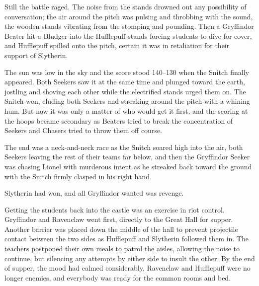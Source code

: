 Still the battle raged. The noise from the stands drowned out any possibility of conversation; the air around the pitch was pulsing and throbbing with the sound, the wooden stands vibrating from the stomping and pounding. Then a Gryffindor Beater hit a Bludger into the Hufflepuff stands forcing students to dive for cover, and Hufflepuff spilled onto the pitch, certain it was in retaliation for their support of Slytherin.

The sun was low in the sky and the score stood 140--130 when the Snitch finally appeared. Both Seekers saw it at the same time and plunged toward the earth, jostling and shoving each other while the electrified stands urged them on. The Snitch won, eluding both Seekers and streaking around the pitch with a whining hum. But now it was only a matter of who would get it first, and the scoring at the hoops became secondary as Beaters tried to break the concentration of Seekers and Chasers tried to throw them off course.

The end was a neck-and-neck race as the Snitch soared high into the air, both Seekers leaving the rest of their teams far below, and then the Gryffindor Seeker was chasing Lionel with murderous intent as he streaked back toward the ground with the Snitch firmly clasped in his right hand.

Slytherin had won, and all Gryffindor wanted was revenge.

Getting the students back into the castle was an exercise in riot control. Gryffindor and Ravenclaw went first, directly to the Great Hall for supper. Another barrier was placed down the middle of the hall to prevent projectile contact between the two sides as Hufflepuff and Slytherin followed them in. The teachers postponed their own meals to patrol the aisles, allowing the noise to continue, but silencing any attempts by either side to insult the other. By the end of supper, the mood had calmed considerably, Ravenclaw and Hufflepuff were no longer enemies, and everybody was ready for the common rooms and bed. 


